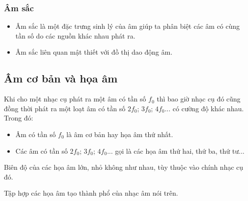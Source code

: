 \subsubsection{Âm sắc}	
\begin{itemize}
	\item Âm sắc là một đặc trưng sinh lý của âm giúp ta phân biệt các âm có cùng tần số do các nguồn khác nhau phát ra. 
	
	\item Âm sắc liên quan mật thiết với đồ thị dao động âm.
\end{itemize} 
\subsection{Âm cơ bản và họa âm}
Khi cho một nhạc cụ phát ra một âm có tần số $f_0$ thì bao giờ nhạc cụ đó cũng đồng thời phát ra một loạt âm có tần số $2f_0$; $3f_0$; $4f_0$... có cường độ khác nhau. Trong đó:
\begin{itemize}
	\item Âm có tần số $f_0$ là âm cơ bản hay họa âm thứ nhất.
	\item Các âm có tần số $2f_0$; $3f_0$; $4f_0$... gọi là các họa âm thứ hai, thứ ba, thứ tư...
\end{itemize}

Biên độ của các họa âm lớn, nhỏ không như nhau, tùy thuộc vào chính nhạc cụ đó.

Tập hợp các họa âm tạo thành phổ của nhạc âm nói trên.
